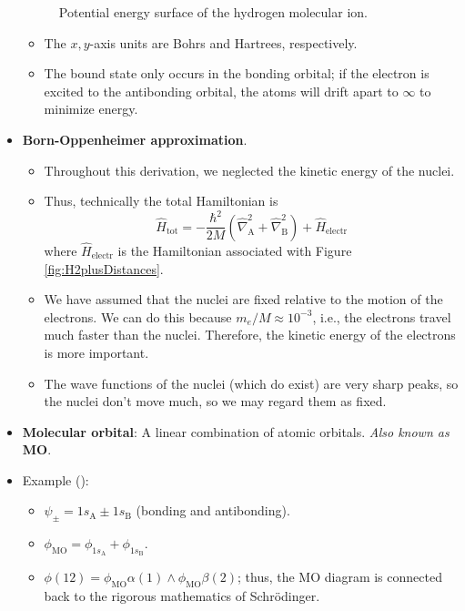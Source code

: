 \documentclass[../notes.tex]{subfiles}
\begin{document}
\begin{itemize}
\begin{figure}[h!]
        \caption{Potential energy surface of the hydrogen molecular ion.}
        \label{fig:H2plusPES}
    \end{figure}
    \begin{itemize}
        \item The $x,y$-axis units are Bohrs and Hartrees, respectively.
        \item The bound state only occurs in the bonding orbital; if the electron is excited to the antibonding orbital, the atoms will drift apart to $\infty$ to minimize energy.
    \end{itemize}
    \item \textbf{Born-Oppenheimer approximation}.
    \begin{itemize}
        \item Throughout this derivation, we neglected the kinetic energy of the nuclei.
        \item Thus, technically the total Hamiltonian is
        \begin{equation*}
            \hat{H}_\text{tot} = -\frac{\hbar^2}{2M}(\hat{\nabla}_\text{A}^2+\hat{\nabla}_\text{B}^2)+\hat{H}_\text{electr}
        \end{equation*}
        where $\hat{H}_\text{electr}$ is the Hamiltonian associated with Figure \ref{fig:H2plusDistances}.
        \item We have assumed that the nuclei are fixed relative to the motion of the electrons. We can do this because $m_e/M\approx 10^{-3}$, i.e., the electrons travel much faster than the nuclei. Therefore, the kinetic energy of the electrons is more important.
        \item The wave functions of the nuclei (which do exist) are very sharp peaks, so the nuclei don't move much, so we may regard them as fixed.
    \end{itemize}
    \item \textbf{Molecular orbital}: A linear combination of atomic orbitals. \emph{Also known as} \textbf{MO}.
    \item Example ():
    \begin{itemize}
        \item $\psi_\pm=1s_\text{A}\pm 1s_\text{B}$ (bonding and antibonding).
        \item $\phi_\text{MO}=\phi_{1s_\text{A}}+\phi_{1s_\text{B}}$.
        \item $\phi(12)=\phi_\text{MO}\alpha(1)\wedge\phi_\text{MO}\beta(2)$; thus, the MO diagram is connected back to the rigorous mathematics of Schr\"{o}dinger.

\end{itemize}
\end{itemize}
\end{document}
